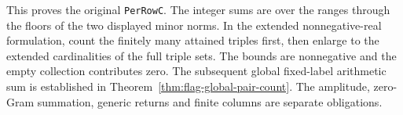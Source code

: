 This proves the original \texttt{PerRowC}. The integer sums
are over the ranges through the floors of the two displayed
minor norms. In the extended nonnegative-real formulation,
count the finitely many attained triples first, then enlarge
to the extended cardinalities of the full triple sets. The
bounds are nonnegative and the empty collection contributes zero.
The subsequent global fixed-label arithmetic sum is established
in Theorem~\ref{thm:flag-global-pair-count}. The amplitude,
zero-Gram summation, generic returns and finite columns are
separate obligations.
